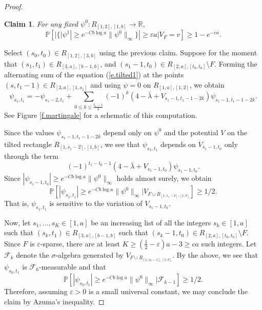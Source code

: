 \documentclass{amsart}
\newtheorem{claim}[equation]{Claim}
\newcommand{\eref}[1]{(\ref{e.#1})}
\newcommand{\fref}[1]{Figure \ref{f.#1}}
\numberwithin{equation}{section}
\numberwithin{figure}{section}
\newcommand{\R}{\mathbb{R}}
\renewcommand{\P}{\mathbb{P}}
\newcommand{\ep}{\varepsilon}
\begin{document}
\begin{proof}
\begin{claim}
\label{cl.martingale}
For any fixed $\psi^0 : R_{[1,2],[1,b]} \to \R$,
\begin{equation*}
\P[|\{|\psi^1| \geq e^{- C b \log a} \| \psi^0 \|_\infty \}| \geq \ep a | V_F = v] \geq 1 - e^{-c a}.
\end{equation*}
\end{claim}

Select $(s_0,t_0) \in R_{[1,2],[3,b]}$ using the previous claim.  Suppose for the moment that $(s_1,t_1) \in R_{[3,a],[b-1,b]}$, and $(s_1-1,t_0) \in R_{[2,a],[t_0,t_0]} \setminus F$.  Forming the alternating sum of the equation \eref{tilted1} at the points $(s,t_1-1) \in R_{[3,a],[1,s_1]}$ and using $\psi = 0$ on $R_{[1,a],[1,2]}$, we obtain
\begin{equation*}
\psi_{s_1,t_1} = - \psi_{s_1-2,t_1} + \sum_{0 \leq k \leq \frac{t_1-1}{2}} (-1)^k (4 - \bar \lambda + V_{s_1-1,t_1-1-2k}) \psi_{s_1-1,t_1-1-2k}.
\end{equation*}
See \fref{martingale} for a schematic of this computation.

Since the values $\psi_{s_1-1,t_1 - 1 - 2k}$ depend only on $\psi^0$ and the potential $V$ on the tilted rectangle $R_{[1,s_1-2],[1,b]}$, we see that $\psi_{s_1,t_1}$ depends on $V_{s_1-1,t_0}$ only through the term
\begin{equation*}
(-1)^{t_1-t_0-1} (4 - \bar \lambda + V_{s_1-1,t_0}) \psi_{s_1-1,t_0}.
\end{equation*}
Since $|\psi_{s_1-1,t_0}| \geq e^{-C b \log a} \|\psi^0\|_\infty$ holds almost surely, we obtain
\begin{equation*}
\P[|\psi_{s_1,t_1}| \geq e^{-C b \log a} \| \psi^0 \|_\infty | V_{F \cup R_{[1,s_1-2],[1,b]}}] \geq 1/2.
\end{equation*}
That is, $\psi_{s_1,t_1}$ is sensitive to the variation of $V_{s_1-1,t_0}$.

Now, let $s_1, ..., s_K \in [1,a]$ be an increasing list of all the integers $s_k \in [1,a]$ such that $(s_k,t_1) \in R_{[3,a],[b-1,b]}$ such that $(s_k-1,t_0) \in R_{[2,a],[t_0,t_0]} \setminus F$.  Since $F$ is $\ep$-sparse, there are at least $K \geq (\tfrac12 - \ep) a - 3 \geq c a$ such integers.  Let $\mathcal F_k$ denote the $\sigma$-algebra generated by $V_{F \cup R_{[1,s_k-1],[1,b]}}$.  By the above, we see that $\psi_{s_k,t_1}$ is $\mathcal F_k$-measurable and that
\begin{equation*}
\P[|\psi_{s_k,t_1}| \geq e^{-C b \log a} \| \psi^0 \|_\infty | \mathcal F_{k-1}] \geq 1/2.
\end{equation*}
Therefore, assuming $\ep > 0$ is a small universal constant, we may conclude the claim by Azuma's inequality.


\end{proof}
\end{document}
